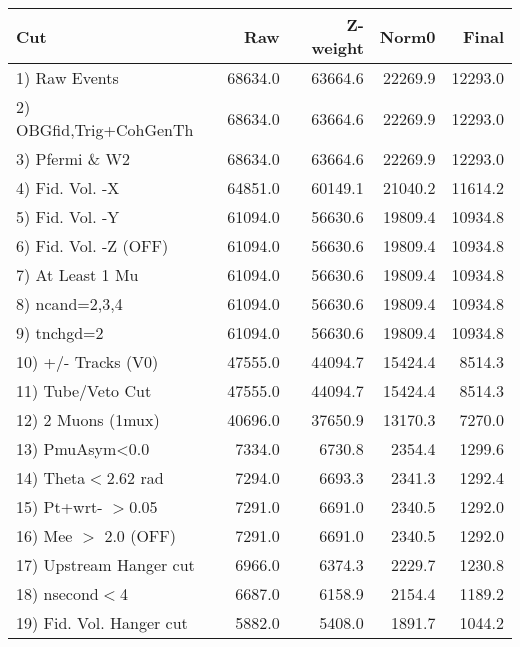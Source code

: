  \begin{table}[h!]\centering
 \begin{tabular}{||l||r|r|r|r||}
 \hline
 \hline
 Cut & Raw & Z-weight & Norm0 & Final \\
 \hline
  1) Raw Events           &     68634.0 &     63664.6 &     22269.9 &     12293.0 \\
  2) OBGfid,Trig+CohGenTh &     68634.0 &     63664.6 &     22269.9 &     12293.0 \\
  3) Pfermi \& W2         &     68634.0 &     63664.6 &     22269.9 &     12293.0 \\
  4) Fid. Vol. -X         &     64851.0 &     60149.1 &     21040.2 &     11614.2 \\
  5) Fid. Vol. -Y         &     61094.0 &     56630.6 &     19809.4 &     10934.8 \\
  6) Fid. Vol. -Z (OFF)   &     61094.0 &     56630.6 &     19809.4 &     10934.8 \\
  7) At Least 1 Mu        &     61094.0 &     56630.6 &     19809.4 &     10934.8 \\
  8) ncand=2,3,4          &     61094.0 &     56630.6 &     19809.4 &     10934.8 \\
  9) tnchgd=2             &     61094.0 &     56630.6 &     19809.4 &     10934.8 \\
 10) +/- Tracks (V0)      &     47555.0 &     44094.7 &     15424.4 &      8514.3 \\
 11) Tube/Veto Cut        &     47555.0 &     44094.7 &     15424.4 &      8514.3 \\
 12) 2 Muons (1mux)       &     40696.0 &     37650.9 &     13170.3 &      7270.0 \\
 13) PmuAsym<0.0          &      7334.0 &      6730.8 &      2354.4 &      1299.6 \\
 14) Theta$<$2.62 rad     &      7294.0 &      6693.3 &      2341.3 &      1292.4 \\
 15) Pt+wrt- $>$0.05      &      7291.0 &      6691.0 &      2340.5 &      1292.0 \\
 16) Mee $>$ 2.0  (OFF)   &      7291.0 &      6691.0 &      2340.5 &      1292.0 \\
 17) Upstream Hanger cut  &      6966.0 &      6374.3 &      2229.7 &      1230.8 \\
 18) nsecond$<$4          &      6687.0 &      6158.9 &      2154.4 &      1189.2 \\
 19) Fid. Vol. Hanger cut &      5882.0 &      5408.0 &      1891.7 &      1044.2 \\

\end{tabular}
\end{table}
